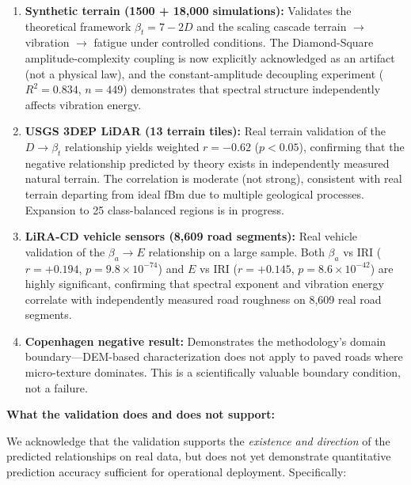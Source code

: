 \documentclass[11pt]{article}
\begin{document}
\begin{enumerate}[leftmargin=*]
\item \textbf{Synthetic terrain (1500 + 18,000 simulations):} Validates the theoretical framework $\beta_t = 7-2D$ and the scaling cascade terrain $\rightarrow$ vibration $\rightarrow$ fatigue under controlled conditions. The Diamond-Square amplitude-complexity coupling is now explicitly acknowledged as an artifact (not a physical law), and the constant-amplitude decoupling experiment ($R^2 = 0.834$, $n=449$) demonstrates that spectral structure independently affects vibration energy.

\item \textbf{USGS 3DEP LiDAR (13 terrain tiles):} Real terrain validation of the $D \rightarrow \beta_t$ relationship yields weighted $r = -0.62$ ($p < 0.05$), confirming that the negative relationship predicted by theory exists in independently measured natural terrain. The correlation is moderate (not strong), consistent with real terrain departing from ideal fBm due to multiple geological processes. Expansion to 25 class-balanced regions is in progress.

\item \textbf{LiRA-CD vehicle sensors (8,609 road segments):} Real vehicle validation of the $\beta_a \rightarrow E$ relationship on a large sample. Both $\beta_a$ vs IRI ($r = +0.194$, $p = 9.8 \times 10^{-74}$) and $E$ vs IRI ($r = +0.145$, $p = 8.6 \times 10^{-42}$) are highly significant, confirming that spectral exponent and vibration energy correlate with independently measured road roughness on 8,609 real road segments.

\item \textbf{Copenhagen negative result:} Demonstrates the methodology's domain boundary---DEM-based characterization does not apply to paved roads where micro-texture dominates. This is a scientifically valuable boundary condition, not a failure.
\end{enumerate}

\textbf{What the validation does and does not support:}

We acknowledge that the validation supports the \emph{existence and direction} of the predicted relationships on real data, but does not yet demonstrate quantitative prediction accuracy sufficient for operational deployment. Specifically:
\end{document}
